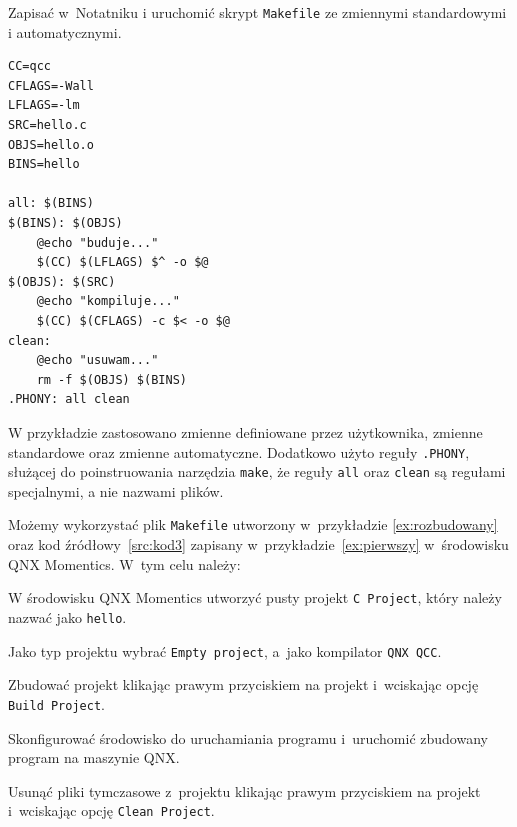 \begin{example}
Zapisać w~Notatniku i uruchomić skrypt \lstinline[style=MyBashStyle]{Makefile} ze zmiennymi standardowymi i automatycznymi.


\begin{lstlisting}[style=MyBashStyle,caption=Rozbudowany plik Makefile]
CC=qcc
CFLAGS=-Wall
LFLAGS=-lm
SRC=hello.c
OBJS=hello.o
BINS=hello

all: $(BINS)
$(BINS): $(OBJS)
	@echo "buduje..."
	$(CC) $(LFLAGS) $^ -o $@
$(OBJS): $(SRC)
	@echo "kompiluje..."
	$(CC) $(CFLAGS) -c $< -o $@
clean:
	@echo "usuwam..."
	rm -f $(OBJS) $(BINS)
.PHONY: all clean
\end{lstlisting}
W przykładzie zastosowano zmienne definiowane przez użytkownika, zmienne standardowe oraz zmienne automatyczne. Dodatkowo użyto reguły \lstinline[style=MyBashStyle]{.PHONY}, służącej do poinstruowania narzędzia \lstinline[style=MyBashStyle]{make}, że reguły \lstinline[style=MyBashStyle]{all} oraz \lstinline[style=MyBashStyle]{clean} są regułami specjalnymi, a nie nazwami plików.
\end{example}


\begin{example}
Możemy wykorzystać plik \lstinline[style=MyBashStyle]{Makefile} utworzony w~przykładzie \ref{ex:rozbudowany} oraz kod źródłowy~\ref{src:kod3} zapisany w~przykładzie~\ref{ex:pierwszy} w~środowisku QNX Momentics. W~tym celu należy:

\begin{myenumerate}
\item W środowisku QNX Momentics utworzyć pusty projekt \lstinline[style=MyBashStyle]{C Project}, który należy nazwać jako \lstinline[style=MyBashStyle]{hello}.
\item Jako typ projektu wybrać \lstinline[style=MyBashStyle]{Empty project}, a~jako kompilator \lstinline[style=MyBashStyle]{QNX QCC}.
\item Zbudować projekt klikając prawym przyciskiem na projekt i~wciskając opcję \lstinline[style=MyBashStyle]{Build Project}.
\item Skonfigurować środowisko do uruchamiania programu i~uruchomić zbudowany program na maszynie QNX.
\item Usunąć pliki tymczasowe z~projektu klikając prawym przyciskiem na projekt i~wciskając opcję \lstinline[style=MyBashStyle]{Clean Project}.
\end{myenumerate}



\end{example}

